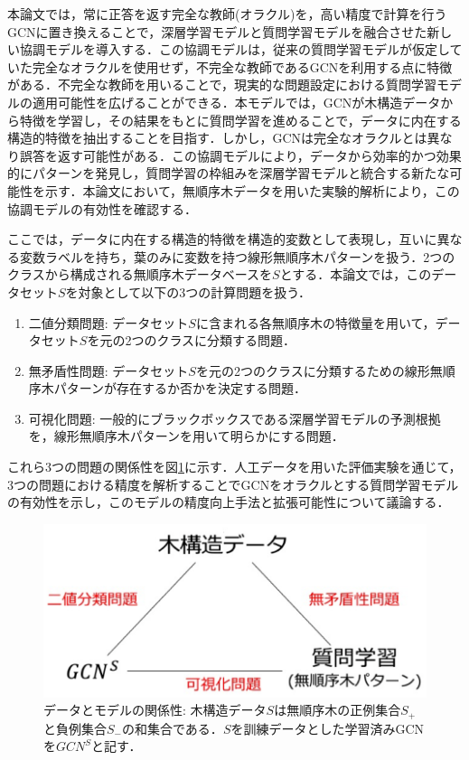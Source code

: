 本論文では，常に正答を返す完全な教師(オラクル)を，高い精度で計算を行うGCNに置き換えることで，深層学習モデルと質問学習モデルを融合させた新しい協調モデルを導入する．この協調モデルは，従来の質問学習モデルが仮定していた完全なオラクルを使用せず，不完全な教師であるGCNを利用する点に特徴がある．不完全な教師を用いることで，現実的な問題設定における質問学習モデルの適用可能性を広げることができる．本モデルでは，GCNが木構造データから特徴を学習し，その結果をもとに質問学習を進めることで，データに内在する構造的特徴を抽出することを目指す．しかし，GCNは完全なオラクルとは異なり誤答を返す可能性がある．この協調モデルにより，データから効率的かつ効果的にパターンを発見し，質問学習の枠組みを深層学習モデルと統合する新たな可能性を示す．本論文において，無順序木データを用いた実験的解析により，この協調モデルの有効性を確認する．

ここでは，データに内在する構造的特徴を構造的変数として表現し，互いに異なる変数ラベルを持ち，葉のみに変数を持つ線形無順序木パターンを扱う．2つのクラスから構成される無順序木データベースを$S$とする．本論文では，このデータセット$S$を対象として以下の3つの計算問題を扱う．
\begin{enumerate}
  \item[(1)] 二値分類問題: データセット$S$に含まれる各無順序木の特徴量を用いて，データセット$S$を元の2つのクラスに分類する問題．
  \item[(2)] 無矛盾性問題: データセット$S$を元の2つのクラスに分類するための線形無順序木パターンが存在するか否かを決定する問題．
  \item[(3)] 可視化問題: 一般的にブラックボックスである深層学習モデルの予測根拠を，線形無順序木パターンを用いて明らかにする問題．
\end{enumerate}
これら3つの問題の関係性を図\ref{fig:relation}に示す．人工データを用いた評価実験を通じて，3つの問題における精度を解析することでGCNをオラクルとする質問学習モデルの有効性を示し，このモデルの精度向上手法と拡張可能性について議論する．

\begin{figure}[tb]
  \centering
  \includegraphics[scale=0.5]{fig/fig-relation.eps}
  \caption{データとモデルの関係性: 木構造データ$S$は無順序木の正例集合$S_+$と負例集合$S_-$の和集合である．$S$を訓練データとした学習済みGCNを$GCN^S$と記す．}\label{fig:relation}
\end{figure}

